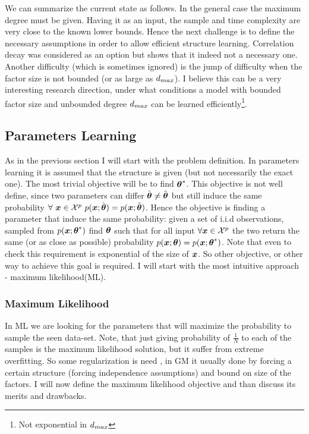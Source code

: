 We can summarize the current state as follows. 
In the general case the maximum degree must be given. Having it as an input, the sample and time complexity are very close to the known lower bounds. 
Hence the next challenge is to define the necessary assumptions in order to allow efficient structure learning. 
Correlation decay was considered as an option\cite{montanari2009graphical} but \cite{bresler2014structure} shows that it indeed not a necessary one. 
Another difficulty (which is sometimes ignored) is the jump of difficulty when the factor size is not bounded (or as large as $d_{max}$). 
I believe this can be a very interesting research direction, under what conditions  a model with bounded factor size and unbounded degree $d_{max}$ can be learned efficiently\footnote{Not exponential in $d_{max}$}.

\subsection{Parameters Learning}
As in the previous section I will start with the problem definition. 
In parameters learning it is assumed that the structure is given (but not necessarily the exact one).
The most trivial objective will be to find ${\boldsymbol{\theta}}^{*}$.  
This  objective is not well define,  since two parameters can differ $\hat{\boldsymbol{\theta}} \neq \tilde{\boldsymbol{\theta}}$ but still induce the same probability $\forall\ \xx \in \cX^p\ p(\xx;\hat{\thetav}) = p(\xx;\tilde{\thetav})$.
Hence the objective is finding a parameter that induce the same probability: given a set of i.i.d observations, sampled from $p(\boldsymbol{x};{\boldsymbol{\theta}}^{*})$ find $\boldsymbol{\theta}$ such that for all input $\forall \boldsymbol{x} \in {\cal X}^{p}$ the two return the same (or as close as possible) probability $p(\boldsymbol{x};\boldsymbol{\theta}) = p(\boldsymbol{x};{\boldsymbol{\theta}}^{*})$.
Note that even to check this requirement is exponential of the size of $\boldsymbol{x}$.
So other objective, or other way to achieve this goal is required.
I will start with the  most intuitive approach - maximum likelihood(ML).

\subsubsection{Maximum Likelihood}
\label{sec:max_likelihood}
In ML we are looking for the parameters that will maximize the probability to sample the seen data-set.
Note, that just giving probability of $\frac{1}{N}$ to each of the samples is the maximum likelihood solution, but it suffer from extreme overfitting.
So some regularization is need , in GM it usually done by forcing a certain structure (forcing independence assumptions) and bound on size of the factors.
I will now define the maximum likelihood objective and than discuss its merits and drawbacks.

